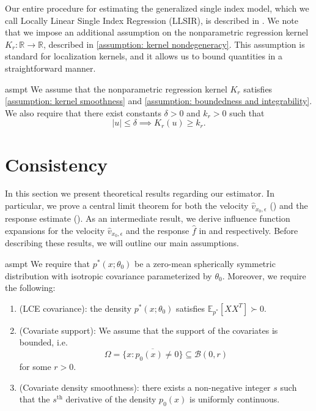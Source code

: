 \documentclass[11pt]{article}
\begin{document}
Our entire procedure for estimating the generalized single index model, which we call Locally Linear Single Index Regression (LLSIR), is described in . We note that we impose an additional assumption on the nonparametric regression kernel $K_r:\mathbb{R} \rightarrow \mathbb{R}$, described in \cref{assumption: kernel nondegeneracy}. This assumption is standard for localization kernels, and it allows us to bound quantities in a straightforward manner.

\begin{restatable}{asmpt}{} \label{assumption: kernel nondegeneracy}
    We assume that the nonparametric regression kernel $K_r$ satisfies \cref{assumption: kernel smoothness} and \cref{assumption: boundedness and integrability}. We also require that there exist constants $\delta > 0$ and $k_r > 0$ such that 
    \[|u| \leq \delta \implies K_r(u) \geq k_r.\]
\end{restatable}

\section{Consistency}

In this section we present theoretical results regarding our estimator. In particular, we prove a central limit theorem for both the velocity $\hat{v}_{x_0, \epsilon}$ () and the response estimate (). As an intermediate result, we derive influence function expansions for the velocity $\hat{v}_{x_0, \epsilon}$ and the response $\hat f$ in  and  respectively. Before describing these results, we will outline our main assumptions.

\begin{restatable}{asmpt}{} \label{assumption: lce and covariate density}
    We require that $p^*(x;\theta_0)$ be a zero-mean spherically symmetric distribution with isotropic covariance parameterized by $\theta_0$. Moreover, we require the following: 
    \begin{enumerate}
        \item (LCE covariance): the density $p^*(x;\theta_0)$ satisfies $\mathbb{E}_{p^*}[XX^T] \succ 0$. 
        \item (Covariate support): We assume that the support of the covariates is bounded, i.e. \[\Omega = \overline{\{x : p_0(x) \neq 0\}} \subseteq \mathcal{B}(0, r)\]
        for some $r > 0$.
        \item (Covariate density smoothness): 
        there exists a non-negative integer $s$ such that the $s^{\text{th}}$ derivative of the density $p_0(x)$ is uniformly continuous.
    \end{enumerate} 
\end{restatable}
\end{document}
